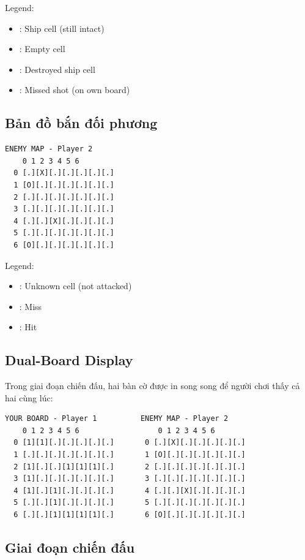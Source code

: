 Legend:
\begin{itemize}
    \item [1]: Ship cell (still intact)
    \item [.]: Empty cell
    \item [X]: Destroyed ship cell
    \item [O]: Missed shot (on own board)
\end{itemize}

\subsection{Bản đồ bắn đối phương}

\begin{verbatim}
ENEMY MAP - Player 2
    0 1 2 3 4 5 6
  0 [.][X][.][.][.][.][.]
  1 [O][.][.][.][.][.][.]
  2 [.][.][.][.][.][.][.]
  3 [.][.][.][.][.][.][.]
  4 [.][.][X][.][.][.][.]
  5 [.][.][.][.][.][.][.]
  6 [O][.][.][.][.][.][.]
\end{verbatim}

Legend:
\begin{itemize}
    \item [.]: Unknown cell (not attacked)
    \item [O]: Miss
    \item [X]: Hit
\end{itemize}

\subsection{Dual-Board Display}

Trong giai đoạn chiến đấu, hai bàn cờ được in song song để người chơi thấy cả hai cùng lúc:

\begin{verbatim}
YOUR BOARD - Player 1          ENEMY MAP - Player 2
    0 1 2 3 4 5 6                  0 1 2 3 4 5 6
  0 [1][1][.][.][.][.][.]       0 [.][X][.][.][.][.][.]
  1 [.][.][.][.][.][.][.]       1 [O][.][.][.][.][.][.]
  2 [1][.][.][1][1][1][.]       2 [.][.][.][.][.][.][.]
  3 [1][.][.][.][.][.][.]       3 [.][.][.][.][.][.][.]
  4 [1][.][1][.][.][.][.]       4 [.][.][X][.][.][.][.]
  5 [.][.][1][.][.][.][.]       5 [.][.][.][.][.][.][.]
  6 [.][.][1][1][1][1][.]       6 [O][.][.][.][.][.][.]
\end{verbatim}

\subsection{Giai đoạn chiến đấu}

